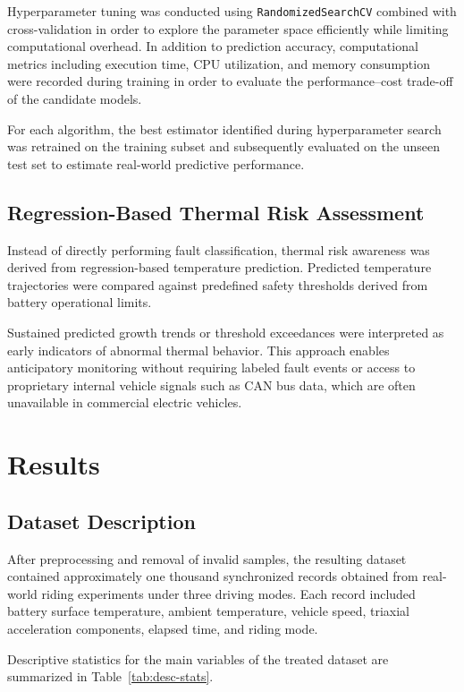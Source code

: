 \documentclass[runningheads]{llncs}
\begin{document}
Hyperparameter tuning was conducted using \texttt{RandomizedSearchCV} combined with cross-validation in order to explore the parameter space efficiently while limiting computational overhead. In addition to prediction accuracy, computational metrics including execution time, CPU utilization, and memory consumption were recorded during training in order to evaluate the performance--cost trade-off of the candidate models.

For each algorithm, the best estimator identified during hyperparameter search was retrained on the training subset and subsequently evaluated on the unseen test set to estimate real-world predictive performance.


\subsection{Regression-Based Thermal Risk Assessment}

Instead of directly performing fault classification, thermal risk awareness was derived from regression-based temperature prediction. Predicted temperature trajectories were compared against predefined safety thresholds derived from battery operational limits.

Sustained predicted growth trends or threshold exceedances were interpreted as early indicators of abnormal thermal behavior. This approach enables anticipatory monitoring without requiring labeled fault events or access to proprietary internal vehicle signals such as CAN bus data, which are often unavailable in commercial electric vehicles.


\section{Results}
\label{sec:results}


\subsection{Dataset Description}

After preprocessing and removal of invalid samples, the resulting dataset contained approximately one thousand synchronized records obtained from real-world riding experiments under three driving modes. Each record included battery surface temperature, ambient temperature, vehicle speed, triaxial acceleration components, elapsed time, and riding mode.

Descriptive statistics for the main variables of the treated dataset are summarized in Table~\ref{tab:desc-stats}.
\end{document}
